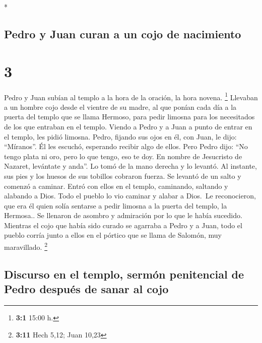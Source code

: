 \begin{paracol}{2}
\begin{otherlanguage}{english}
\end{otherlanguage}

\switchcolumn[0]*

\hypertarget{pedro-y-juan-curan-a-un-cojo-de-nacimiento}{%
\subsection{Pedro y Juan curan a un cojo de
nacimiento}\label{pedro-y-juan-curan-a-un-cojo-de-nacimiento}}

\hypertarget{section-4}{%
\section{3}\label{section-4}}

 Pedro y Juan subían al templo a la hora de la oración, la
hora novena. \footnote{\textbf{3:1} 15:00 h.}  Llevaban a
un hombre cojo desde el vientre de su madre, al que ponían cada día a la
puerta del templo que se llama Hermoso, para pedir limosna para los
necesitados de los que entraban en el templo.  Viendo a
Pedro y a Juan a punto de entrar en el templo, les pidió limosna.
 Pedro, fijando sus ojos en él, con Juan, le dijo:
``Míranos''.  Él les escuchó, esperando recibir algo de
ellos.  Pero Pedro dijo: ``No tengo plata ni oro, pero lo
que tengo, eso te doy. En nombre de Jesucristo de Nazaret, levántate y
anda''.  Lo tomó de la mano derecha y lo levantó. Al
instante, sus pies y los huesos de sus tobillos cobraron fuerza.
 Se levantó de un salto y comenzó a caminar. Entró con
ellos en el templo, caminando, saltando y alabando a Dios.
 Todo el pueblo lo vio caminar y alabar a Dios.
 \,Le reconocieron, que era él quien solía sentarse a
pedir limosna a la puerta del templo, la Hermosa.. Se llenaron de
asombro y admiración por lo que le había sucedido. 
Mientras el cojo que había sido curado se agarraba a Pedro y a Juan,
todo el pueblo corría junto a ellos en el pórtico que se llama de
Salomón, muy maravillado. \footnote{\textbf{3:11} Hech 5,12; Juan 10,23}

\hypertarget{discurso-en-el-templo-sermuxf3n-penitencial-de-pedro-despuuxe9s-de-sanar-al-cojo}{%
\subsection{Discurso en el templo, sermón penitencial de Pedro después
de sanar al
cojo}\label{discurso-en-el-templo-sermuxf3n-penitencial-de-pedro-despuuxe9s-de-sanar-al-cojo}}


\end{paracol}
